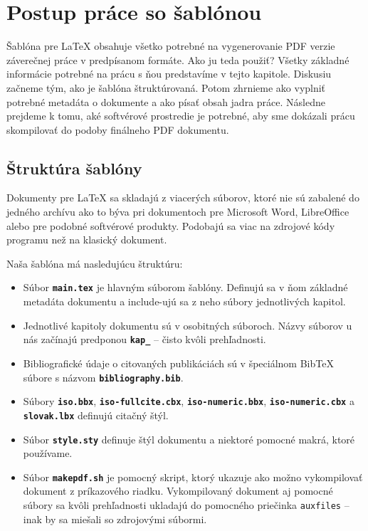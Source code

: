 \chapter{Postup práce so šablónou}

Šablóna pre LaTeX obsahuje všetko potrebné na vygenerovanie PDF verzie záverečnej práce v predpísanom formáte. Ako ju teda použiť? Všetky základné informácie potrebné na prácu s ňou predstavíme v tejto kapitole. Diskusiu začneme tým, ako je šablóna štruktúrovaná. Potom zhrnieme ako vyplniť potrebné metadáta o dokumente a ako písať obsah jadra práce. Následne prejdeme k tomu, aké softvérové prostredie je potrebné, aby sme dokázali prácu skompilovať do podoby finálneho PDF dokumentu.

\section{Štruktúra šablóny}

Dokumenty pre LaTeX sa skladajú z viacerých súborov, ktoré nie sú zabalené do jedného archívu ako to býva pri dokumentoch pre Microsoft Word, LibreOffice alebo pre podobné softvérové produkty. Podobajú sa viac na zdrojové kódy programu než na klasický dokument.

Naša šablóna má nasledujúcu štruktúru:
\begin{itemize}
\item Súbor \textbf{\texttt{main.tex}} je hlavným súborom šablóny. Definujú sa v ňom základné metadáta dokumentu a include-ujú sa z neho súbory jednotlivých kapitol.

\item Jednotlivé kapitoly dokumentu sú v osobitných súboroch. Názvy súborov u nás začínajú predponou \textbf{\texttt{kap\_}} -- čisto kvôli prehľadnosti.

\item Bibliografické údaje o citovaných publikáciách sú v špeciálnom BibTeX súbore s názvom \textbf{\texttt{bibliography.bib}}.

\item Súbory \textbf{\texttt{iso.bbx}}, \textbf{\texttt{iso-fullcite.cbx}}, \textbf{\texttt{iso-numeric.bbx}}, \textbf{\texttt{iso-numeric.cbx}} a \textbf{\texttt{slovak.lbx}} definujú citačný štýl.

\item Súbor \textbf{\texttt{style.sty}} definuje štýl dokumentu a niektoré pomocné makrá, ktoré používame.

\item Súbor \textbf{\texttt{makepdf.sh}} je pomocný skript, ktorý ukazuje ako možno vykompilovať dokument z príkazového riadku. Vykompilovaný dokument aj pomocné súbory sa kvôli prehľadnosti ukladajú do pomocného priečinka \texttt{auxfiles} -- inak by sa miešali so zdrojovými súbormi.
\end{itemize}

